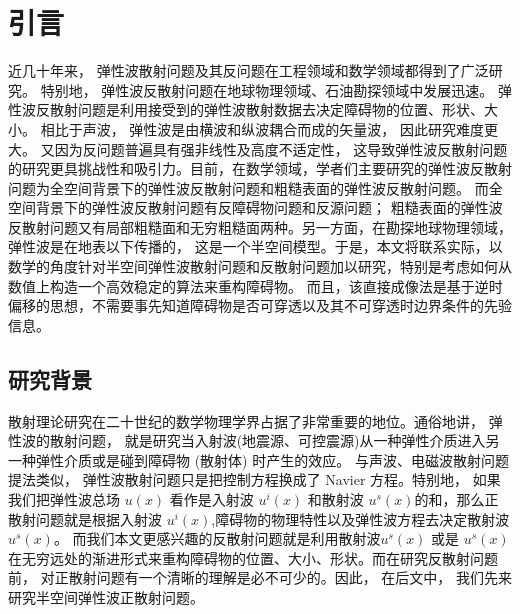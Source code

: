 \chapter{引言}\label{chap:introduction}
近几十年来， 弹性波散射问题及其反问题在工程领域和数学领域都得到了广泛研究\cite{landau}。 特别地， 弹性波反散射问题在地球物理领域、石油勘探领域中发展迅速。
弹性波反散射问题是利用接受到的弹性波散射数据去决定障碍物的位置、形状、大小。 相比于声波， 弹性波是由横波和纵波耦合而成的矢量波， 因此研究难度更大。 又因为反问题普遍具有强非线性及高度不适定性， 这导致弹性波反散射问题的研究更具挑战性和吸引力。目前，在数学领域，学者们主要研究的弹性波反散射问题为全空间背景下的弹性波反散射问题\cite{bonnet2005inverse,bao2018inverse}和粗糙表面的弹性波反散射问题\cite{liu2019near}。 而全空间背景下的弹性波反散射问题有反障碍物问题和反源问题； 粗糙表面的弹性波反散射问题又有局部粗糙面和无穷粗糙面两种。另一方面，在勘探地球物理领域， 弹性波是在地表以下传播的， 这是一个半空间模型。于是，本文将联系实际，以数学的角度针对半空间弹性波散射问题和反散射问题加以研究，特别是考虑如何从数值上构造一个高效稳定的算法来重构障碍物。 而且，该直接成像法是基于逆时偏移的思想，不需要事先知道障碍物是否可穿透以及其不可穿透时边界条件的先验信息。
\section{研究背景}
 散射理论研究在二十世纪的数学物理学界占据了非常重要的地位。通俗地讲， 弹性波的散射问题， 就是研究当入射波(地震源、可控震源)从一种弹性介质进入另一种弹性介质或是碰到障碍物 (散射体) 时产生的效应。 与声波、电磁波散射问题提法类似， 弹性波散射问题只是把控制方程换成了 Navier 方程。特别地， 如果我们把弹性波总场 $u(x)$ 看作是入射波 $u^i(x)$ 和散射波 $u^s(x)$的和，那么正散射问题就是根据入射波 $u^i(x)$,障碍物的物理特性以及弹性波方程去决定散射波 $u^s(x)$。 而我们本文更感兴趣的反散射问题就是利用散射波$u^s(x)$ 或是 $u^s(x)$ 在无穷远处的渐进形式来重构障碍物的位置、大小、形状。而在研究反散射问题前， 对正散射问题有一个清晰的理解是必不可少的。因此， 在后文中， 我们先来研究半空间弹性波正散射问题。
